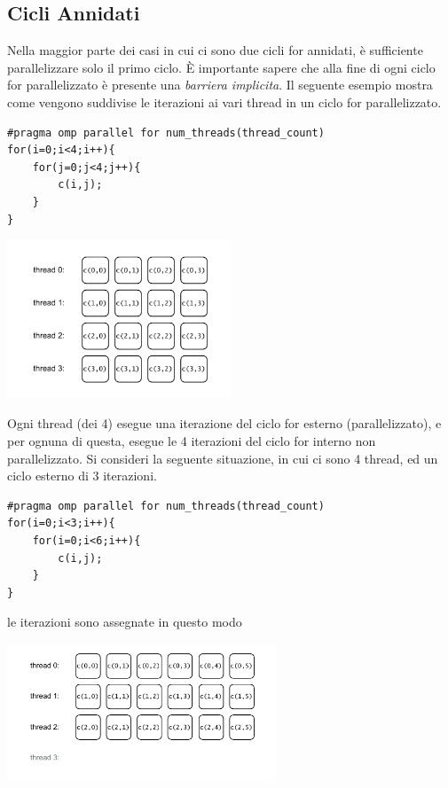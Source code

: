 \documentclass[10pt, letterpaper]{report}
\begin{document}
\subsection{Cicli Annidati}
Nella maggior parte dei casi in cui ci sono due cicli for annidati, è sufficiente parallelizzare solo il primo ciclo. È importante sapere che alla fine di ogni ciclo for parallelizzato è presente una \textit{barriera implicita}. Il seguente esempio mostra come vengono suddivise le iterazioni ai vari thread in un ciclo for parallelizzato.
\begin{lstlisting}[style=CStyle]
#pragma omp parallel for num_threads(thread_count) 
for(i=0;i<4;i++){
    for(j=0;j<4;j++){
        c(i,j);
    }
}
\end{lstlisting}
\begin{center}
    \includegraphics[width=0.5\textwidth ]{images/cicliAnnidati.drawio.pdf}
\end{center}
Ogni thread (dei 4) esegue una iterazione del ciclo for esterno (parallelizzato), e per ognuna di questa, esegue le 4 iterazioni del ciclo for interno non parallelizzato. Si consideri la seguente situazione, in cui ci sono 4 thread, ed un ciclo esterno di 3 iterazioni.
\begin{lstlisting}[style=CStyle]
#pragma omp parallel for num_threads(thread_count) 
for(i=0;i<3;i++){
    for(i=0;i<6;i++){
        c(i,j);
    }
}
\end{lstlisting}
le iterazioni sono assegnate in questo modo
    \begin{center}
        \includegraphics[width=0.6\textwidth ]{images/cicliAnnidati2.drawio.pdf}
    \end{center}
\end{document}

